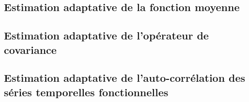 

\subsection{Estimation adaptative de la fonction moyenne}




\subsection{Estimation adaptative de l'opérateur de covariance}



\subsection{Estimation adaptative de l'auto-corrélation des séries temporelles fonctionnelles}

